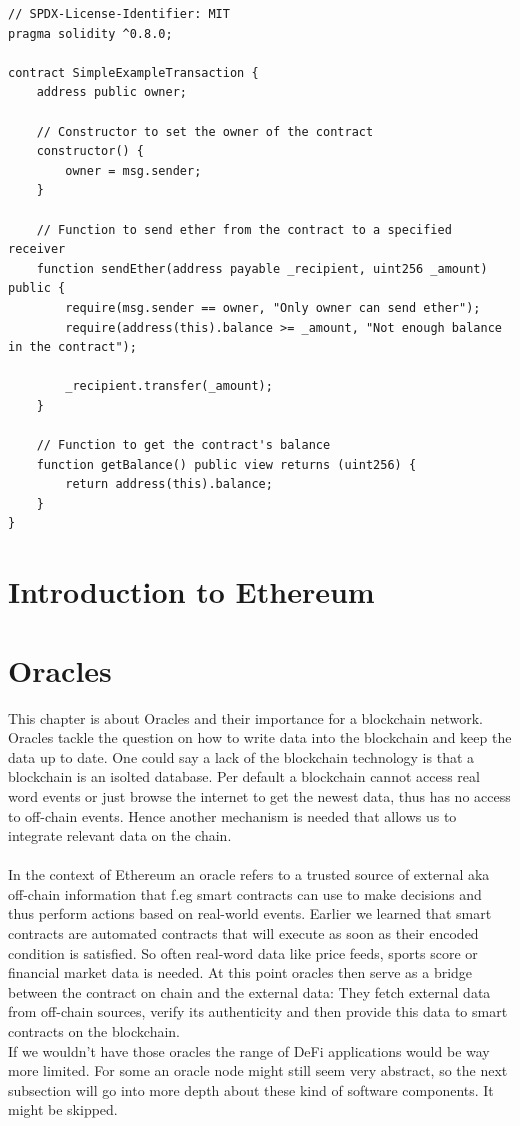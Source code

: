 \documentclass{article}
\begin{document}
\begin{verbatim}
// SPDX-License-Identifier: MIT
pragma solidity ^0.8.0;

contract SimpleExampleTransaction {
    address public owner;

    // Constructor to set the owner of the contract
    constructor() {
        owner = msg.sender;
    }

    // Function to send ether from the contract to a specified receiver 
    function sendEther(address payable _recipient, uint256 _amount) public {
        require(msg.sender == owner, "Only owner can send ether");
        require(address(this).balance >= _amount, "Not enough balance in the contract");

        _recipient.transfer(_amount);
    }

    // Function to get the contract's balance
    function getBalance() public view returns (uint256) {
        return address(this).balance;
    }
}

\end{verbatim}
\section{Introduction to Ethereum}
\section{Oracles}
This chapter is about Oracles and their importance for a blockchain network. Oracles tackle the question on how to write data into the blockchain and keep the data up to date. One could say a lack of the blockchain technology is that a blockchain is an isolted database. Per default a blockchain cannot access real word events or just browse the internet to get the newest data, thus has no access to off-chain events. Hence another mechanism is needed that allows us to integrate relevant data on the chain.\\
\\
In the context of Ethereum an oracle refers to a trusted source of external aka off-chain  information that f.eg smart contracts can use to make decisions and thus perform actions based on real-world events. Earlier we learned that smart contracts are automated contracts that will execute as soon as their encoded condition is satisfied. So often real-word data like price feeds, sports score or financial market data is needed. At this point oracles then serve as a bridge between the contract on chain and the external data: They fetch external data from off-chain sources, verify its authenticity and then provide this data to smart contracts on the blockchain.\\
If we wouldn't have those oracles the range of DeFi applications would be way more limited. 
For some an oracle node might still seem very abstract, so the next subsection will go into more depth about these kind of software components. It might be skipped.
\end{document}
